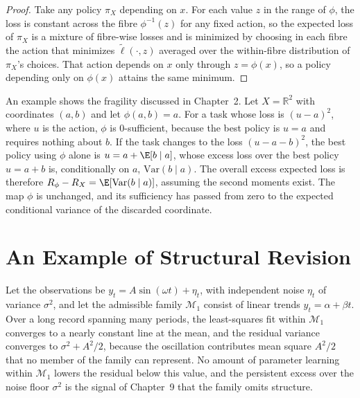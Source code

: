 \begin{proof}
Take any policy $\pi_X$ depending on $x$. For each value $z$ in the range of $\phi$, the loss is constant across the fibre $\phi^{-1}(z)$ for any fixed action, so the expected loss of $\pi_X$ is a mixture of fibre-wise losses and is minimized by choosing in each fibre the action that minimizes $\tilde\ell(\cdot,z)$ averaged over the within-fibre distribution of $\pi_X$'s choices. That action depends on $x$ only through $z=\phi(x)$, so a policy depending only on $\phi(x)$ attains the same minimum.
\end{proof}

An example shows the fragility discussed in Chapter~2. Let $X=\mathbb{R}^2$ with coordinates $(a,b)$ and let $\phi(a,b)=a$. For a task whose loss is $(u-a)^2$, where $u$ is the action, $\phi$ is $0$-sufficient, because the best policy is $u=a$ and requires nothing about $b$. If the task changes to the loss $(u-a-b)^2$, the best policy using $\phi$ alone is $u=a+\E[b\mid a]$, whose excess loss over the best policy $u=a+b$ is, conditionally on $a$, $\mathrm{Var}(b\mid a)$. The overall excess expected loss is therefore $R_\phi-R_X=\E[\mathrm{Var}(b\mid a)]$, assuming the second moments exist. The map $\phi$ is unchanged, and its sufficiency has passed from zero to the expected conditional variance of the discarded coordinate.

\chapter{An Example of Structural Revision}

Let the observations be $y_t=A\sin(\omega t)+\eta_t$, with independent noise $\eta_t$ of variance $\sigma^2$, and let the admissible family $\mathcal{M}_1$ consist of linear trends $y_t=\alpha+\beta t$. Over a long record spanning many periods, the least-squares fit within $\mathcal{M}_1$ converges to a nearly constant line at the mean, and the residual variance converges to $\sigma^2+A^2/2$, because the oscillation contributes mean square $A^2/2$ that no member of the family can represent. No amount of parameter learning within $\mathcal{M}_1$ lowers the residual below this value, and the persistent excess over the noise floor $\sigma^2$ is the signal of Chapter~9 that the family omits structure.

